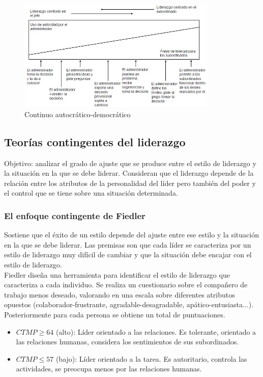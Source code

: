 \documentclass[12pt]{article}
\theoremstyle{definition_wo_parentheses}
\begin{document}
\begin{figure}[H]
\centering
\includegraphics[width=0.85\textwidth]{continuo}
\caption{Continuo autocrático-democrático}
\label{fig:continuo}
\end{figure}

\subsection{Teorías contingentes del liderazgo}
Objetivo: analizar el grado de ajuste que se produce entre el estilo de liderazgo y la situación en la que se debe liderar. Consideran que el liderazgo depende de la relación entre los atributos de la personalidad del líder pero también del poder y el control que se tiene sobre una situación determinada.

\subsubsection{El enfoque contingente de Fiedler}

	Sostiene que el éxito de un estilo depende del ajuste entre ese estilo y la situación en la que se debe liderar. Las premisas son que cada líder se caracteriza por un estilo de liderazgo muy difícil de cambiar y que la situación debe encajar con el estilo de liderazgo.\\
	Fiedler diseña una herramienta para identificar el estilo de liderazgo que caracteriza a cada individuo. Se realiza un cuestionario sobre el compañero de trabajo menos deseado, valorando en una escala sobre diferentes atributos opuestos (colaborador-frustrante, agradable-desagradable, apático-entusiasta...). Posteriormente para cada persona se obtiene un total de puntuaciones.
	
	\begin{itemize}
	\item $CTMP \geq 64$ (alto): Líder orientado a las relaciones. Es tolerante, orientado a las relaciones humanas, considera los sentimientos de sus subordinados.
	\item $CTMP \leq 57$ (bajo): Líder orientado a la tarea. Es autoritario, controla las actividades, se preocupa menos por las relaciones humanas.
	\end{itemize}
	
\end{document}
